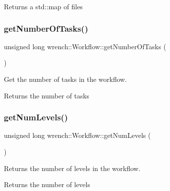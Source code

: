 \begin{DoxyReturn}{Returns}
a std\+::map of files 
\end{DoxyReturn}
\mbox{\label{classwrench_1_1_workflow_ab2b98a21d67824c2fc17cdc71c7e3909}} 
\subsubsection{\texorpdfstring{get\+Number\+Of\+Tasks()}{getNumberOfTasks()}}
{\footnotesize\ttfamily unsigned long wrench\+::\+Workflow\+::get\+Number\+Of\+Tasks (\begin{DoxyParamCaption}{ }\end{DoxyParamCaption})}



Get the number of tasks in the workflow. 

\begin{DoxyReturn}{Returns}
the number of tasks 
\end{DoxyReturn}
\mbox{\label{classwrench_1_1_workflow_a15f12b7d5088e8e1e2130545c2b795ea}} 
\subsubsection{\texorpdfstring{get\+Num\+Levels()}{getNumLevels()}}
{\footnotesize\ttfamily unsigned long wrench\+::\+Workflow\+::get\+Num\+Levels (\begin{DoxyParamCaption}{ }\end{DoxyParamCaption})}



Returns the number of levels in the workflow. 

\begin{DoxyReturn}{Returns}
the number of levels 
\end{DoxyReturn}
\mbox{\label{classwrench_1_1_workflow_a2d6acb74faf1153f491bf7b52847ce82}} 
